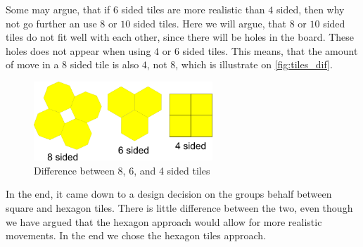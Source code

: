 Some may argue, that if $6$ sided tiles are more realistic than $4$ sided, then why not go further an use $8$ or $10$ sided tiles.
Here we will argue, that $8$ or $10$ sided tiles do not fit well with each other, since there will be holes in the board.
These holes does not appear when using $4$ or $6$ sided tiles.
This means, that the amount of move in a $8$ sided tile is also $4$, not $8$, which is illustrate on \autoref{fig:tiles_dif}.

\begin{figure}[h]
  \centering
    \includegraphics[width=0.6\textwidth]{img/8-6-4-sided-tiles.png}
  \caption{Difference between 8, 6, and 4 sided tiles}
  \label{fig:tiles_dif}
\end{figure}

In the end, it came down to a design decision on the groups behalf between square and hexagon tiles.
There is little difference between the two, even though we have argued that the hexagon approach would allow for more realistic movements.
In the end we chose the hexagon tiles approach.



